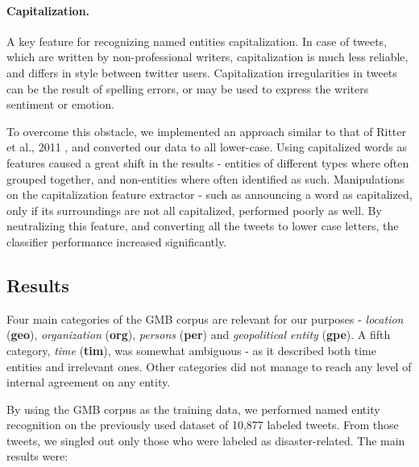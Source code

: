 \documentclass[letterpaper,twocolumn,10pt]{article}
\begin{document}
\paragraph{Capitalization.} A key feature for recognizing named entities capitalization. In case of tweets, which are written by non-professional writers, capitalization is much less reliable, and differs in style between twitter users. Capitalization irregularities in tweets can be the result of spelling errors, or may be used to express the writers sentiment or emotion.

To overcome this obstacle, we implemented an approach similar to that of Ritter et al., 2011 \cite{Ritter11}, and converted our data to all lower-case. Using capitalized words as features caused a great shift in the results - entities of different types where often grouped together, and non-entities where often identified as such. Manipulations on the capitalization feature extractor - such as announcing a word as capitalized, only if its surroundings are not all capitalized, performed poorly as well. By neutralizing this feature, and converting all the tweets to lower case letters, the classifier performance increased significantly.

\subsection{Results}

Four main categories of the GMB corpus are relevant for our purposes - \textit{location} (\textbf{geo}), \textit{organization} (\textbf{org}), \textit{persons} (\textbf{per}) and \textit{geopolitical entity} (\textbf{gpe}). A fifth category, \textit{time} (\textbf{tim}), was somewhat ambiguous - as it described both time entities and irrelevant ones. Other categories did not manage to reach any level of internal agreement on any entity.

By using the GMB corpus as the training data, we performed named entity recognition on the previously used dataset of 10,877 labeled tweets. From those tweets, we singled out only those who were labeled as disaster-related. The main results were:
\end{document}
